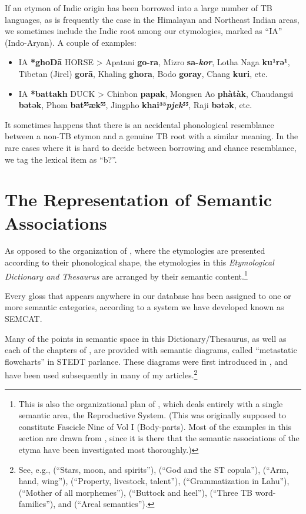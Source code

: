 If an etymon of Indic origin has been borrowed into a large number of TB languages, as is frequently the case in the Himalayan and Northeast Indian areas, we sometimes include the Indic root among our etymologies, marked as “IA” (Indo-Aryan).
A couple of examples:

\begin{itemize}[leftmargin=10pt,itemindent=-10pt]
\item IA \textbf{*ghoDā} HORSE > Apatani \textbf{go-ra}, Mizro \textbf{sa-\textit{kor}}, Lotha Naga \textbf{ku¹rə¹}, Tibetan (Jirel) \textbf{gorā}, Khaling \textbf{ghora}, Bodo \textbf{goray}, Chang \textbf{kuri}, etc.
\item IA \textbf{*battakh} DUCK > Chinbon \textbf{papak}, Mongsen Ao \textbf{phàtàk}, Chaudangsi \textbf{bətək}, Phom \textbf{bat⁵⁵æk⁵⁵}, Jingpho \textbf{khai³³\textit{pjek⁵⁵}}, Raji \textbf{bətək}, etc.
\end{itemize}

It sometimes happens that there is an accidental phonological resemblance between a non-TB etymon and a genuine TB root with a similar meaning. In the rare cases where it is hard to decide between borrowing and chance resemblance, we tag the lexical item as “b?”.

\section{The Representation of Semantic Associations}

As opposed to the organization of \textit{}, where the etymologies are presented according to their phonological shape, the etymologies in this \textit{Etymological Dictionary and Thesaurus} are arranged by their semantic content.\footnote{This is also the organizational plan of \textit{}, which deals entirely with a single semantic area, the Reproductive System. (This was originally supposed to constitute Fascicle Nine of Vol I (Body-parts). Most of the examples in this section are drawn from \textit{}, since it is there that the semantic associations of the etyma have been investigated most thoroughly.)}

 Every gloss that appears anywhere in our database has been assigned to one or more semantic categories, according to a system we have developed known as SEMCAT.

Many of the points in semantic space in this Dictionary/Thesaurus, as well as each of the chapters of \textit{},
are provided with semantic diagrams, called “metastatic flowcharts” in STEDT parlance. These diagrams were first introduced in
\textit{}, and have been used subsequently in many of my articles.\footnote{See, e.g.,
\citealt{JAM-SMS} (“Stars, moon, and spirits”), \citeyear{JAM-GSTC} (“God and the ST copula”),
\citeyear{JAM-AHWST} (“Arm, hand, wing”), \citeyear{JAM-USAI} (“Property, livestock, talent”), \citeyear{JAM-AUD}
(“Grammatization in Lahu”), \citeyear{JAM-MOAM} (“Mother of all morphemes”), \citeyear{JAM-DBH} (“Buttock
and heel”), \citeyear{JAM-3WF} (“Three TB word-families”), and \citeyear{JAM-AS} (“Areal semantics”).}

